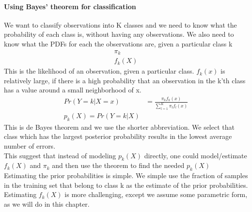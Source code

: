 \documentclass[../document.tex]{subfiles}
\begin{document}
	\paragraph{Using Bayes' theorem for classification}
	We want to classify observations into K classes and we need to know what the probability of each class is, without having any observations.
	We also need to know what the PDFs for each the observations are, given a particular class k
	\begin{equation}
	\begin{split}
		\pi_{k}\\
		f_{k}(X)
	\end{split}
	\end{equation}
	This is the likelihood of an observation, given a particular class. \(f_{k}(x)\) is relatively large, if there is a high probability that an observation in the k'th class has a value around a small neighborhood of x.
	\begin{equation}
	\begin{split}
		Pr(Y=k|X=x)&=\frac{\pi_{k}f_{k}(x)}{\sum_{l=1}^{K}\pi_{l}f_{l}(x)}\\
		p_{k}(X)=Pr(Y=k|X)&
	\end{split}
	\end{equation}
	This is de Bayes theorem and we use the shorter abbreviation. We select that class which has the largest posterior probability results in the lowest average number of errors.\\
	This suggest that instead of modeling \(p_{k}(X)\) directly, one could model/estimate \(f_{k}(X)\) and \(\pi_{k}\) and then use the theorem to find the needed \(p_{k}(X)\)\\
	Estimating the prior probabilities is simple. We simple use the fraction of samples in the training set that belong to class k as the estimate of the prior probabilities.\\
	Estimating \(f_{k}(X)\) is more challenging, except we assume some parametric form, as we will do in this chapter.
\end{document}
